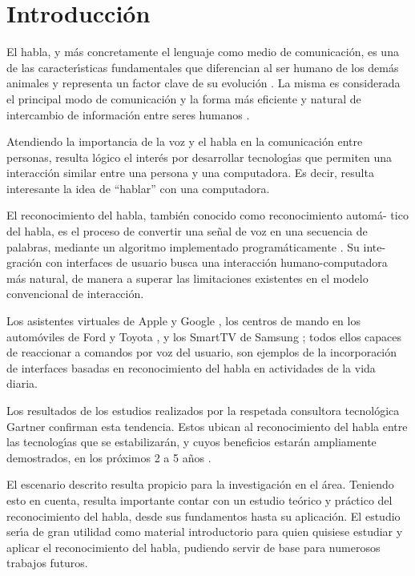 \chapter{Introducci\'on}
\label{sec:intro}

El habla, y m\'as concretamente el lenguaje como medio de comunicaci\'on, es una
de las caracter{\'\i}sticas fundamentales que diferencian al ser humano de los dem\'as
animales y representa un factor clave de su evoluci\'on \cite{SchepartzLanguage1993}. La misma es considerada
el principal modo de comunicaci\'on y la forma m\'as eficiente y natural de intercambio 
de informaci\'on entre seres humanos \cite{GaikwadAReview2010}.

Atendiendo la importancia de la voz y el habla en la comunicaci\'on entre personas,
resulta l\'ogico el inter\'es por desarrollar tecnolog{\'\i}as que permiten una interacci\'on
similar entre una persona y una computadora. Es decir, resulta interesante la idea 
de ``hablar'' con una computadora.

El reconocimiento del habla, tambi\'en conocido como reconocimiento autom\'a-
tico del habla, es el proceso de convertir una se\~nal de voz en una secuencia de
palabras, mediante un algoritmo implementado program\'aticamente \cite{JaisalAReview2012}. Su inte-
graci\'on con interfaces de usuario busca una interacci\'on humano-computadora m\'as
natural, de manera a superar las limitaciones existentes en el modelo convencional
de interacci\'on.

Los asistentes virtuales de Apple \cite{AppleSiri} y Google \cite{GoogleNow}, 
los centros de mando en los autom\'oviles de Ford \cite{FordSync} y Toyota \cite{ToyotaEntune},
y los SmartTV de Samsung \cite{SamsungVoiceControl}; todos ellos capaces de reaccionar a 
comandos por voz del usuario, son ejemplos de la incorporaci\'on de interfaces basadas 
en reconocimiento del habla en actividades de la vida diaria.

Los resultados de los estudios realizados por la respetada consultora tecnol\'ogica
Gartner confirman esta tendencia. Estos ubican al reconocimiento del habla entre
las tecnolog{\'\i}as que se estabilizar\'an, y cuyos beneficios estar\'an ampliamente
demostrados, en los pr\'oximos 2 a 5 a\~nos \cite{Gartner2013}. 

El escenario descrito resulta propicio para la investigaci\'on en el \'area.
Teniendo esto en cuenta, resulta importante contar con un estudio te\'orico
y pr\'actico del reconocimiento del habla, desde sus fundamentos hasta su
aplicaci\'on. El estudio ser{\'\i}a de gran utilidad como material introductorio
para quien quisiese estudiar y aplicar el reconocimiento del habla, pudiendo
servir de base para numerosos trabajos futuros.

